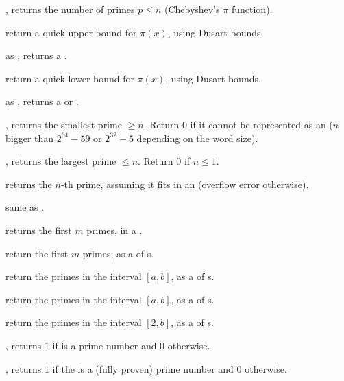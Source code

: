 

, returns the number of primes $p\leq n$
(Chebyshev's $\pi$ function).

 return a quick upper bound for
$\pi(x)$, using Dusart bounds.

 as , returns a
.

 return a quick lower bound for
$\pi(x)$, using Dusart bounds.

 as , returns
a  or .


, returns the smallest prime $\geq n$. Return
$0$ if it cannot be represented as an  ($n$ bigger than $2^{64} -
59$ or $2^{32} - 5$ depending on the word size).

, returns the largest prime $\leq n$. Return
$0$ if $n\leq 1$.

 returns the $n$-th prime, assuming it fits in an
 (overflow error otherwise).

 same as .

 returns the first $m$ primes, in a
.

 return the first $m$ primes, as a  of
s.

 return the primes in the interval
$[a,b]$, as a  of s.

 return the primes in the
interval $[a,b]$, as a  of s.

 return the primes in the interval $[2,b]$,
as a  of s.


, returns $1$ if  is a prime number and
$0$ otherwise.

, returns $1$ if the   is a
(fully proven) prime number and $0$ otherwise.

